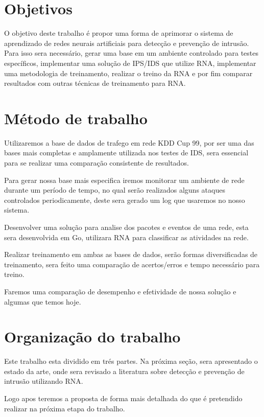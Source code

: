 \documentclass[
	12pt,				%
	openright,			%
	oneside,
	a4paper,			%
	english,			%
	french,				%
	spanish,			%
	brazil				%
	]{abntex2}
\begin{document}
\section{Objetivos}

O objetivo deste trabalho é propor uma forma de aprimorar o sistema de aprendizado de redes neurais artificiais para detecção e prevenção de intrusão. 
Para isso sera necessário, gerar uma base em um ambiente controlado para testes específicos, implementar uma solução de IPS/IDS que utilize RNA, implementar uma metodologia de treinamento, realizar o treino da RNA e por fim comparar resultados com outras técnicas de treinamento para RNA.


\section{Método de trabalho}

Utilizaremos a base de dados de trafego em rede KDD Cup 99, por ser uma das bases mais completas e amplamente utilizada nos testes de IDS, sera essencial para se realizar uma comparação consistente de resultados.

Para gerar nossa base mais especifica iremos monitorar um ambiente de rede durante um período de tempo, no qual serão realizados alguns ataques controlados periodicamente, deste sera gerado um log que usaremos no nosso sistema.

Desenvolver uma solução para analise dos pacotes e eventos de uma rede, esta sera desenvolvida em Go, utilizara RNA para classificar as atividades na rede.

Realizar treinamento em ambas as bases de dados, serão formas diversificadas de treinamento, sera feito uma comparação de acertos/erros e tempo necessário para treino.

Faremos uma comparação de desempenho e efetividade de nossa solução e algumas que temos hoje.

\section{Organização do trabalho}

Este trabalho esta dividido em trés partes.
Na próxima seção, sera apresentado o estado da arte, onde sera revisado a literatura sobre detecção e prevenção de intrusão utilizando RNA.

Logo apos teremos a proposta  de forma mais detalhada do que é pretendido realizar na próxima etapa do trabalho.
\end{document}
